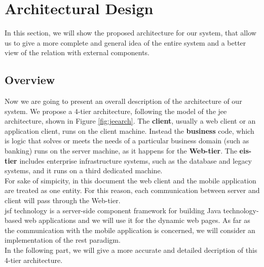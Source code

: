 \section{Architectural Design} \label{sec:arch-design}

In this section, we will show the proposed architecture for our system, that allow us to give a more complete and general idea of the entire system and a better view of the relation with external components.

\subsection{Overview} \label{subsec:overview}
Now we are going to present an overall description of the architecture of our system. We propose a 4-tier architecture, following the model of the \acl{jee} architecture, shown in Figure \ref{fig:jeearch}. The \textbf{client}, usually a web client or an application client, runs on the client machine. Instead the \textbf{business} code, which is logic that solves or meets the needs of a particular business domain (such as banking) runs on the server machine, as it happens for the \textbf{Web-tier}. The \textbf{\acl{eis}-tier} includes enterprise infrastructure systems, such as the database and legacy systems, and it runs on a third dedicated machine. \\For sake of simpicity, in this document the web client and the mobile application are treated as one entity. For this reason, each communication between server and client will pass through the Web-tier.
\\ \acs{jsf} technology is a server-side component framework for building Java technology-based web applications and we will use it for the dynamic web pages.
As far as the communication with the mobile application is concerned, we will consider an implementation of the \acs{rest} paradigm.\\
\newline
In the following part, we will give a more accurate and detailed decription of this 4-tier architecture.

